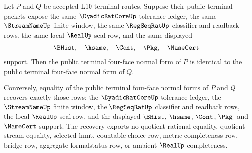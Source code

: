 \begin{theorem}
\label{thm:dyadicratcore-terminal-four-face-normal-form-uniqueness}
Let $P$ and $Q$ be accepted L10 terminal routes. Suppose their public terminal packets expose the same $\DyadicRatCoreUp$ tolerance ledger, the same $\StreamNameUp$ finite window, the same $\RegSeqRatUp$ classifier and readback rows, the same local $\RealUp$ seal row, and the same displayed
$$
\BHist,\quad \hsame,\quad \Cont,\quad \Pkg,\quad \NameCert
$$
support. Then the public terminal four-face normal form of $P$ is identical to the public terminal four-face normal form of $Q$.

Conversely, equality of the public terminal four-face normal forms of $P$ and $Q$ recovers exactly those rows: the $\DyadicRatCoreUp$ tolerance ledger, the $\StreamNameUp$ finite window, the $\RegSeqRatUp$ classifier and readback rows, the local $\RealUp$ seal row, and the displayed $\BHist$, $\hsame$, $\Cont$, $\Pkg$, and $\NameCert$ support. The recovery exports no quotient rational equality, quotient stream equality, selected limit, countable-choice row, metric-completeness row, bridge row, aggregate formalstatus row, or ambient $\RealUp$ completeness.
\end{theorem}
